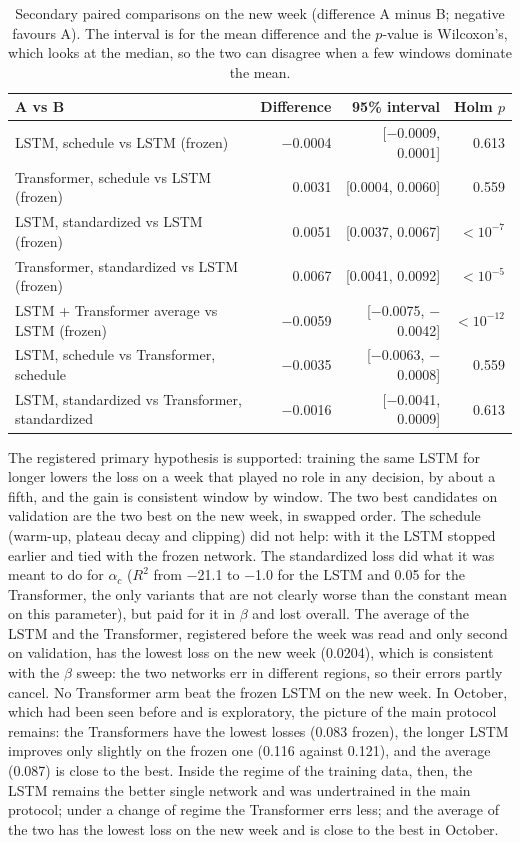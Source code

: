 \begin{table}[htbp]
\centering
\caption{Secondary paired comparisons on the new week (difference A minus B; negative
favours A). The interval is for the mean difference and the $p$-value is Wilcoxon's, which
looks at the median, so the two can disagree when a few windows dominate the mean.}
\label{tab:addendum-secondary}
\footnotesize
\begin{tabular}{lrrr}
\toprule
A vs B & Difference & 95\% interval & Holm $p$ \\
\midrule
LSTM, schedule vs LSTM (frozen) & $-$0.0004 & [$-$0.0009, 0.0001] & 0.613 \\
Transformer, schedule vs LSTM (frozen) & 0.0031 & [0.0004, 0.0060] & 0.559 \\
LSTM, standardized vs LSTM (frozen) & 0.0051 & [0.0037, 0.0067] & $<10^{-7}$ \\
Transformer, standardized vs LSTM (frozen) & 0.0067 & [0.0041, 0.0092] & $<10^{-5}$ \\
LSTM + Transformer average vs LSTM (frozen) & $-$0.0059 & [$-$0.0075, $-$0.0042] & $<10^{-12}$ \\
LSTM, schedule vs Transformer, schedule & $-$0.0035 & [$-$0.0063, $-$0.0008] & 0.559 \\
LSTM, standardized vs Transformer, standardized & $-$0.0016 & [$-$0.0041, 0.0009] & 0.613 \\
\bottomrule
\end{tabular}
\end{table}

The registered primary hypothesis is supported: training the same LSTM for longer lowers the
loss on a week that played no role in any decision, by about a fifth, and the gain is
consistent window by window. The two best candidates on validation are the two best on the
new week, in swapped order. The schedule (warm-up, plateau decay and clipping) did not
help: with it the LSTM stopped earlier and tied with the frozen network. The standardized
loss did what it was meant to do for $\alpha_c$ ($R^2$ from
$-$21.1 to
$-$1.0 for the LSTM and
0.05 for the Transformer, the
only variants that are not clearly worse than the constant mean on this parameter), but
paid for it in $\beta$ and lost overall. The average of the LSTM and the Transformer,
registered before the week was read and only second on validation, has the lowest loss on
the new week (0.0204), which is consistent with the
$\beta$ sweep: the two networks err in different regions, so their errors partly cancel. No
Transformer arm beat the frozen LSTM on the new week. In October, which had been seen before
and is exploratory, the picture of the main protocol remains: the Transformers have the
lowest losses (0.083 frozen),
the longer LSTM improves only slightly on the frozen one
(0.116 against
0.121), and the average
(0.087) is close to the best.
Inside the regime of the training data, then, the LSTM remains the better single network
and was undertrained in the main protocol; under a change of regime the Transformer errs
less; and the average of the two has the lowest loss on the new week and is close to the
best in October.


